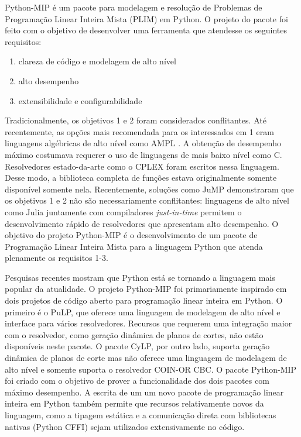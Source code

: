 \documentclass[a4paper,11pt,fleqn]{article}
\begin{document}
Python-MIP é um pacote para modelagem e resolução de Problemas de
Programação Linear Inteira Mista (PLIM)\cite{Wolsey1998} em Python.
O projeto do pacote foi feito com o objetivo de desenvolver uma ferramenta
que atendesse os seguintes requisitos:
\begin{enumerate}
	\item clareza de código e modelagem de alto nível
	\item alto desempenho
	\item extensibilidade e configurabilidade
\end{enumerate}
Tradicionalmente, os objetivos 1 e 2 foram considerados conflitantes.
Até recentemente, as opções mais recomendada para os interessados
em 1 eram linguagens algébricas de alto nível como AMPL \citep{Fourer1987}.
A obtenção de desempenho máximo costumava requerer o uso de linguagens
de mais baixo nível como C\citep{Johnson1991a}. Resolvedores estado-da-arte
como o CPLEX foram escritos nessa linguagem\citep{Bixby2002}. Desse
modo, a biblioteca completa de funções estava originalmente somente
disponível somente nela. Recentemente, soluções como JuMP\citep{Dunning2015}
demonstraram que os objetivos 1 e 2 não são necessariamente conflitantes:
linguagens de alto nível como Julia juntamente com compiladores \emph{just-in-time}
permitem o desenvolvimento rápido de resolvedores que apresentam alto
desempenho. O objetivo do projeto Python-MIP é o desenvolvimento de
um pacote de Programação Linear Inteira Mista para a linguagem Python
que atenda plenamente os requisitos 1-3.

Pesquisas recentes mostram que Python está se tornando a linguagem
mais popular da atualidade\citep{pythonEconomist2018}. O projeto Python-MIP
foi primariamente inspirado em dois projetos de código aberto para
programação linear inteira em Python. O primeiro é o PuLP\citep{Mitchell2009},
que oferece uma linguagem de modelagem de alto nível e interface para
vários resolvedores. Recursos que requerem uma integração maior com
o resolvedor, como geração dinâmica de planos de cortes, não estão
disponíveis neste pacote. O pacote CyLP, por outro lado, suporta geração
dinâmica de planos de corte mas não oferece uma linguagem de modelagem
de alto nível\citep{Towhidi2016} e somente suporta o resolvedor COIN-OR
CBC\citep{Forrest2005}. O pacote Python-MIP foi criado com o objetivo
de prover a funcionalidade dos dois pacotes com máximo desempenho.
A escrita de um um novo pacote de programação linear inteira em Python
também permite que recursos relativamente novos da linguagem, como
a tipagem estática e a comunicação direta com bibliotecas nativas
(Python CFFI) sejam utilizados extensivamente no código.
\end{document}
